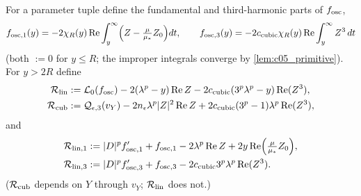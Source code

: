 \begin{definition}[Components of $\mc{E}_5$]
  \label{def:c05_E5_remainders}
  For a parameter tuple define the fundamental and third-harmonic parts of $f_{\textup{osc}}$,
  \begin{equation}\label{eqn:approx_E5_oscillatory_split}
    f_{\textup{osc},1}(y)=-2\chi_R(y)\operatorname{Re}\int_y^\infty\Bigl(Z-\tfrac{\mu}{\mu_*}Z_0\Bigr)dt,\qquad
    f_{\textup{osc},3}(y)=-2c_{\textup{cubic}}\chi_R(y)\operatorname{Re}\int_y^\infty Z^3\,dt
  \end{equation}
  (both $:=0$ for $y\le R$; the improper integrals converge by \cref{lem:c05_primitive}). For $y>2R$ define
  \begin{align}
    \mathcal{R}_{\textup{lin}}&:=\mathcal{L}_0(f_{\textup{osc}})-2(\lambda^p-y)\operatorname{Re}Z
      -2c_{\textup{cubic}}(3^p\lambda^p-y)\operatorname{Re}(Z^3),\label{eqn:approx_E5_linear_response}\\
    \mathcal{R}_{\textup{cub}}&:=\mathcal{Q}_{\epsilon,3}(v_Y)-2n_\epsilon\lambda^p|Z|^2\operatorname{Re}Z
      +2c_{\textup{cubic}}(3^p-1)\lambda^p\operatorname{Re}(Z^3),\label{eqn:approx_E5_cubic_response}
  \end{align}
  and
  \begin{equation}\label{eqn:approx_E5_linear_components}
  \begin{aligned}
    \mathcal{R}_{\textup{lin},1}&:=|D|^pf_{\textup{osc},1}'+f_{\textup{osc},1}-2\lambda^p\operatorname{Re}Z
      +2y\operatorname{Re}\Bigl(\tfrac{\mu}{\mu_*}Z_0\Bigr),\\
    \mathcal{R}_{\textup{lin},3}&:=|D|^pf_{\textup{osc},3}'+f_{\textup{osc},3}
      -2c_{\textup{cubic}}3^p\lambda^p\operatorname{Re}(Z^3).
  \end{aligned}
  \end{equation}
  ($\mathcal{R}_{\textup{cub}}$ depends on $Y$ through $v_Y$; $\mathcal{R}_{\textup{lin}}$ does not.)
\end{definition}

